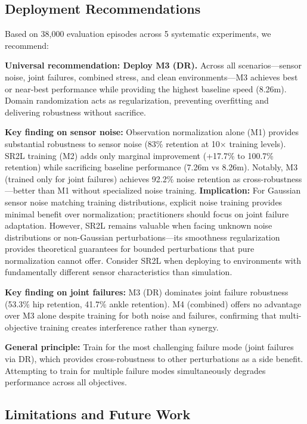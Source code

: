 \documentclass[conference]{IEEEtran}
\begin{document}
\subsection{Deployment Recommendations}

Based on 38,000 evaluation episodes across 5 systematic experiments, we recommend:

\textbf{Universal recommendation: Deploy M3 (DR).} Across all scenarios—sensor noise, joint failures, combined stress, and clean environments—M3 achieves best or near-best performance while providing the highest baseline speed (8.26m). Domain randomization acts as regularization, preventing overfitting and delivering robustness without sacrifice.

\textbf{Key finding on sensor noise:} Observation normalization alone (M1) provides substantial robustness to sensor noise (83\% retention at 10$\times$ training levels). SR2L training (M2) adds only marginal improvement (+17.7\% to 100.7\% retention) while sacrificing baseline performance (7.26m vs 8.26m). Notably, M3 (trained only for joint failures) achieves 92.2\% noise retention as cross-robustness—better than M1 without specialized noise training. \textbf{Implication:} For Gaussian sensor noise matching training distributions, explicit noise training provides minimal benefit over normalization; practitioners should focus on joint failure adaptation. However, SR2L remains valuable when facing unknown noise distributions or non-Gaussian perturbations—its smoothness regularization provides theoretical guarantees for bounded perturbations that pure normalization cannot offer. Consider SR2L when deploying to environments with fundamentally different sensor characteristics than simulation.

\textbf{Key finding on joint failures:} M3 (DR) dominates joint failure robustness (53.3\% hip retention, 41.7\% ankle retention). M4 (combined) offers no advantage over M3 alone despite training for both noise and failures, confirming that multi-objective training creates interference rather than synergy.

\textbf{General principle:} Train for the most challenging failure mode (joint failures via DR), which provides cross-robustness to other perturbations as a side benefit. Attempting to train for multiple failure modes simultaneously degrades performance across all objectives.

\subsection{Limitations and Future Work}
\end{document}
